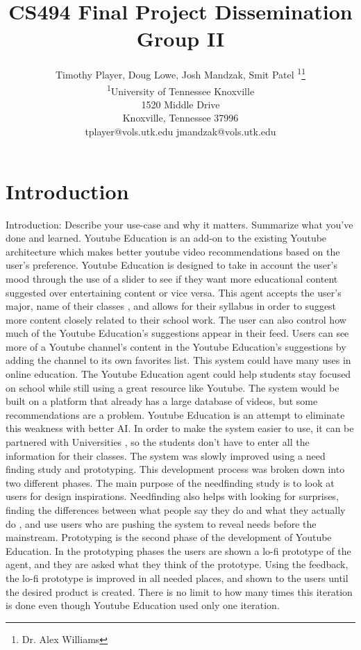 \documentclass[letterpaper]{article} %
\title{CS494 Final Project Dissemination Group II}
\author{Timothy Player, Doug Lowe, Josh Mandzak, Smit Patel \textsuperscript{\rm 1}\thanks{Dr. Alex Williams}\\ %
\textsuperscript{\rm 1}University of Tennessee Knoxville\\ %
1520 Middle Drive\\
Knoxville, Tennessee  37996\\
tplayer@vols.utk.edu jmandzak@vols.utk.edu%
}
\begin{document}
\maketitle
\section{Introduction}
Introduction: Describe your use-case and why it matters. Summarize what you've done and learned.
Youtube Education is an add-on to the existing Youtube architecture which makes better youtube video recommendations based on the user’s preference. Youtube Education is designed to take in account the user’s mood through the use of a slider to see if they want more educational content suggested over entertaining content or vice versa. This agent accepts the user’s major, name of their classes , and allows for their syllabus in order to suggest more content closely related to their school work. The user can also control how much of the Youtube Education’s suggestions appear in their feed. Users can see more of a Youtube channel’s content in the Youtube Education’s suggestions by adding the channel to its own favorites list. 
	This system could have many uses in online education. The Youtube Education agent could help students stay focused on school while still using a great resource like Youtube. The system would be built on a platform that already has a large database of videos, but some recommendations are a problem. Youtube Education is an attempt to eliminate this weakness with better AI. In order to make the system easier to use, it can be partnered with Universities , so the students don’t have to enter all the information for their classes. The system was slowly improved using a need finding study and prototyping. 
	This development process was broken down into two different phases. The main purpose of the needfinding study is to look at users for design inspirations. Needfinding also helps with looking for surprises, finding the differences between what people say they do and what they actually do , and use users who are pushing the system to reveal needs before the mainstream. Prototyping is the second phase of the development of Youtube Education. In the prototyping phases the users are shown a lo-fi prototype of the agent, and they are asked what they think of the prototype. Using the feedback, the lo-fi prototype is improved in all needed places, and shown to the users until the desired product is created.  There is no limit to how many times this iteration is done even though Youtube Education used only one iteration.
\end{document}
